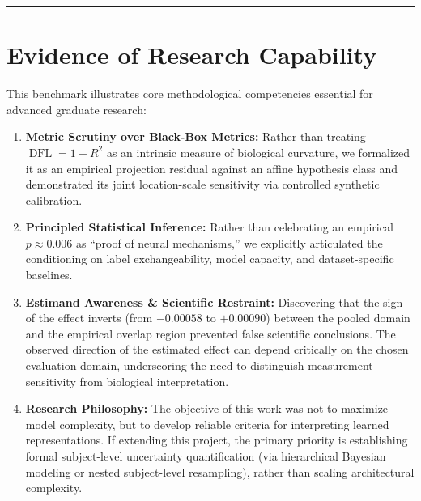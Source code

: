 \documentclass[11pt,a4paper]{article}
\begin{document}
\vspace{0.5em}
\hrule
\vspace{1em}

\section{Evidence of Research Capability}
This benchmark illustrates core methodological competencies essential for advanced graduate research:
\begin{enumerate}
    \item \textbf{Metric Scrutiny over Black-Box Metrics:} Rather than treating $\operatorname{DFL} = 1 - R^2$ as an intrinsic measure of biological curvature, we formalized it as an empirical projection residual against an affine hypothesis class and demonstrated its joint location-scale sensitivity via controlled synthetic calibration.
    \item \textbf{Principled Statistical Inference:} Rather than celebrating an empirical $p \approx 0.006$ as ``proof of neural mechanisms,'' we explicitly articulated the conditioning on label exchangeability, model capacity, and dataset-specific baselines.
    \item \textbf{Estimand Awareness \& Scientific Restraint:} Discovering that the sign of the effect inverts (from $-0.00058$ to $+0.00090$) between the pooled domain and the empirical overlap region prevented false scientific conclusions. The observed direction of the estimated effect can depend critically on the chosen evaluation domain, underscoring the need to distinguish measurement sensitivity from biological interpretation.
    \item \textbf{Research Philosophy:} The objective of this work was not to maximize model complexity, but to develop reliable criteria for interpreting learned representations. If extending this project, the primary priority is establishing formal subject-level uncertainty quantification (via hierarchical Bayesian modeling or nested subject-level resampling), rather than scaling architectural complexity.
\end{enumerate}
\end{document}
